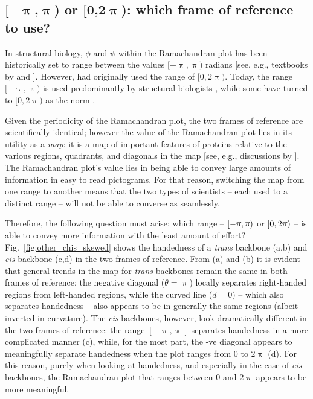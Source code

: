 \documentclass[fleqn,10pt,lineno]{wlpeerj} %
\newcommand{\n}[1]{{\color{black}#1}} %
\newcommand{\Fig}[1]{Fig.~\ref{#1}}
\newcommand{\cis}{{\em{cis}}\xspace}
\newcommand{\trans}{{\em{trans}}\xspace}
\begin{document}
\subsection*{[$\bm{-\uppi}$,$\bm{\uppi}$) or [$\bm{0}$,$\bm{2\uppi}$): which frame of reference to use?} 
In structural biology, $\phi$ and $\psi$ within the Ramachandran plot has been historically set to range between the values $[-\uppi,\uppi)$ radians [see, e.g., textbooks by \cite{Berg2006} and \cite{Alberts2002}]. However, \cite{Ramachandran1963} had originally used the range of $[0,2\uppi)$. Today, the range $[-\uppi,\uppi)$ is used predominantly by structural biologists \citep{Laskowski1993,Laskowski2003,Zacharias2013}, while some have turned to $[0,2\uppi)$ as the norm \citep{Nemethy1966,Voelz2011}. 

Given the periodicity of the Ramachandran plot, \n{the two frames of reference are scientifically identical}; however the value of the Ramachandran plot \n{lies in its utility as a {\em map}}: it is a map of important features of proteins relative to the various regions, quadrants, and diagonals in the map [see, e.g., discussions by \cite{Beck2008}]. The Ramachandran plot's value lies in being able to convey large amounts of information in easy to read pictograms. For that reason, switching the map from one range to another means that the two types of scientists \n{-- each used to a distinct range --} will not be able to converse as seamlessly.

Therefore, the following question must arise: which range -- $[-\uppi,\uppi\n{)}$ or $[0,2\uppi\n{)}$ -- is able to convey more information with the least amount of effort? \Fig{fig:other_chis_skewed} shows the \n{handedness} of a \trans backbone (a,b) and \cis backbone (c,d) in the two frames of reference. From (a) and (b) it is evident that general trends in the map for \trans backbones remain the same in both frames of reference: the negative diagonal ($\theta=\uppi$) locally separates right-handed regions from left-handed regions, while the curved line ($d=0$) -- which also separates handedness -- also appears to be in generally the same regions (albeit inverted in curvature). The \cis backbones, however, look dramatically different in the two frames of reference: the range $[-\uppi,\uppi]$ separates handedness in a more complicated manner (c), while, for the most part, the -ve diagonal appears to meaningfully separate handedness when the plot ranges from $0$ to $2\uppi$ (d). For this reason, purely when looking at handedness, and especially in the case of \cis backbones, the Ramachandran plot that ranges between 0 and $2\uppi$ appears to be more meaningful.
\end{document}

